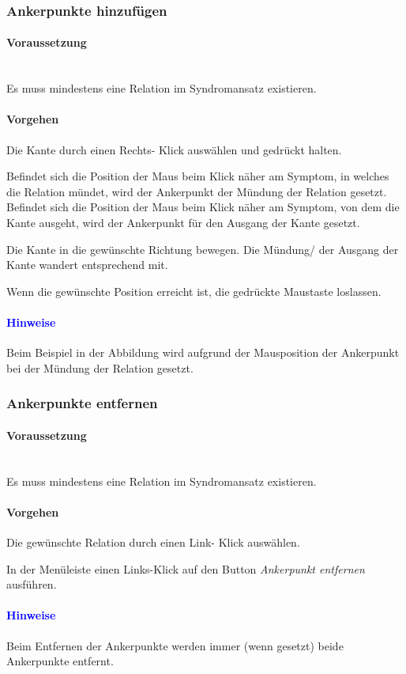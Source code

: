 \documentclass[enabledeprecatedfontcommands,fontsize=11pt,paper=a4,twoside]{scrartcl}
\newcounter{one}
\newcounter{two}[one]
\newcommand*{\hint}{\paragraph{\textcolor{blue}{Hinweise}}}
\newcommand*{\condition}{\paragraph{Voraussetzung}$\;$ \vspace{0.2cm}\\}
\newcommand*{\action}{\paragraph{Vorgehen}}
\let\tempone\itemize
\let\temptwo\enditemize
\renewenvironment{itemize}{\tempone\addtolength{\itemsep}{-10.0pt}}{\temptwo}
\let\origenumerate\enumerate
\let\origendenumerate\endenumerate
\renewenvironment{enumerate}{\origenumerate \addtolength{\itemsep}{-10.0pt}}{\origendenumerate}
\begin{document}
\subsubsection{Ankerpunkte hinzufügen}
		\condition
		Es muss mindestens eine Relation im Syndromansatz existieren.
		\action
		\begin{enumerate}
			\item Die Kante durch einen Rechts- Klick auswählen und gedrückt halten.
			\item Befindet sich die Position der Maus beim Klick näher am Symptom, in welches die Relation mündet, wird der Ankerpunkt der Mündung der Relation gesetzt. Befindet sich die Position der Maus beim Klick näher am Symptom, von dem die Kante ausgeht, wird der Ankerpunkt für den Ausgang der Kante gesetzt. 
			\item Die Kante in die gewünschte Richtung bewegen. Die Mündung/ der Ausgang der Kante wandert entsprechend mit. 
			\item Wenn die gewünschte Position erreicht ist, die gedrückte Maustaste loslassen. 
		\end{enumerate}
		\begin{figure}[ht!]
			\centering
		\end{figure}
		\hint
		\begin{itemize}
			\item Beim Beispiel in der Abbildung wird aufgrund der Mausposition der Ankerpunkt bei der Mündung der Relation gesetzt. \\
		\end{itemize}
		
\subsubsection{Ankerpunkte entfernen}
		\condition
		Es muss mindestens eine Relation im Syndromansatz existieren.
		\action
		\begin{enumerate}
			\item Die gewünschte Relation durch einen Link- Klick auswählen. 
			\item In der Menüleiste einen Links-Klick auf den Button \textit{Ankerpunkt entfernen} ausführen.
		\end{enumerate}
		\hint
		\begin{itemize}
			\item Beim Entfernen der Ankerpunkte werden immer (wenn gesetzt) beide Ankerpunkte entfernt.\\
		\end{itemize}
		
\end{document}
